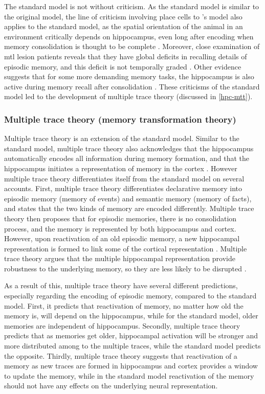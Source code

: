 The standard model is not without criticism. As the standard model is similar to the original \citet{marr71} model, the line of criticism involving place cells to \citet{marr71}'s model also applies to the standard model, as the spatial orientation of the animal in an environment critically depends on hippocampus, even long after encoding when memory consolidation is thought to be complete \citep[e.g.][]{mumby99, sutherland01, clark05}. Moreover, close examination of \gls{mtl} lesion patients reveals that they have global deficits in recalling details of episodic memory, and this deficit is not temporally graded \citep{cipolotti01, viskontas02}. Other evidence suggests that for some more demanding memory tasks, the hippocampus is also active during memory recall after consolidation \citep{ryan01, wheeler13}. These criticisms of the standard model led to the development of multiple trace theory (discussed in \ref{hpc-mtt}).

\subsubsection{Multiple trace theory (memory transformation theory) \label{hpc-mtt}}
Multiple trace theory is an extension of the standard model. Similar to the standard model,  multiple trace theory also acknowledges that the hippocampus automatically encodes all information during memory formation, and that the hippocampus initiates a representation of memory in the cortex \citep{nadel97}. However multiple trace theory differentiates itself from the standard model on several accounts. First, multiple trace theory differentiates declarative memory into episodic memory (memory of events) and semantic memory (memory of facts), and states that the two kinds of memory are encoded differently. Multiple trace theory then proposes that for episodic memories, there is no consolidation process, and the memory is represented by both hippocampus and cortex. However, upon reactivation of an old episodic memory, a new hippocampal representation is formed to link some of the cortical representation . Multiple trace theory argues that the multiple hippocampal representation provide robustness to the underlying memory, so they are less likely to be disrupted \citep{nadel97}. 

As a result of this, multiple trace theory have several different predictions, especially regarding the encoding of episodic memory, compared to the standard model. First, it predicts that reactivation of memory, no matter how old the memory is, will depend on the hippocampus, while for the standard model, older memories are independent of hippocampus. Secondly, multiple trace theory predicts that as memories get older, hippocampal activation will be stronger and more distributed among to the multiple traces, while the standard model predicts the opposite. Thirdly, multiple trace theory suggests that reactivation of a memory as new traces are formed in hippocampus and cortex provides a window to update the memory, while in the standard model reactivation of the memory should not have any effects on the underlying neural representation. 

